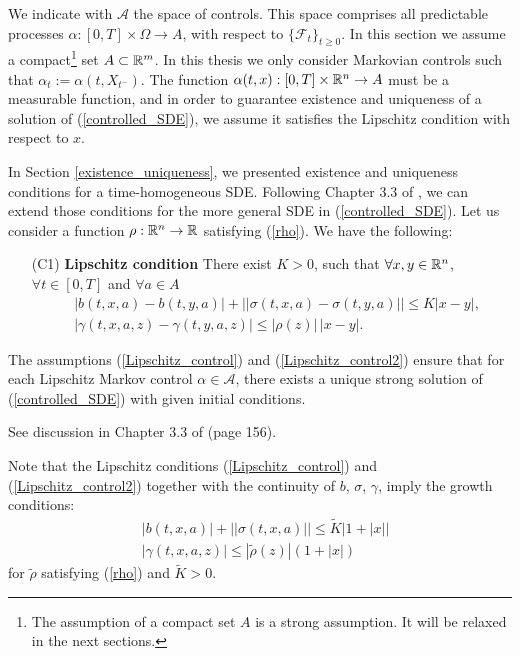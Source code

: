 We indicate with $\mathcal{A}$ the space of controls.
This space comprises all predictable processes $\alpha: [0,T]\times \Omega \to  A$, with respect to $\{\mathcal{F}_{t}\}_{t\geq 0}$.
In this section we assume a compact\footnote{The assumption of a compact set $A$ is a strong assumption. It will be relaxed in the next sections.} set $A \subset \mathbb{R}^m$.
In this thesis we only consider Markovian controls such that $\alpha_t := \alpha(t,X_{t^-}) $.
The function $\alpha(t,x) : [0,T] \times \mathbb{R}^n \to A$ must be a measurable function, and 
in order to guarantee existence and uniqueness of a solution of (\ref{controlled_SDE}), we assume it satisfies the Lipschitz condition with respect to $x$.

In Section \ref{existence_uniqueness}, we presented existence and uniqueness conditions for a time-homogeneous SDE. 
Following Chapter 3.3 of \cite{Skorohod}, we can extend 
those conditions for the more general SDE in (\ref{controlled_SDE}).
Let us consider a function $\rho : \mathbb{R}^n \to \mathbb{R} $ satisfying (\ref{rho}).
We have the following:
\begin{itemize}
 \item[(C1)] \textbf{Lipschitz condition} There exist $K >0$, such that $\forall x,y \in \mathbb{R}^n$, $\forall t \in [0,T]$ and $\forall a \in A$
 \begin{align}\label{Lipschitz_control}
  &|b(t,x,a) - b(t,y,a)| + || \sigma(t,x,a) - \sigma(t,y,a) || \leq K |x-y|,\\  
  & |\gamma(t,x,a,z) - \gamma(t,y,a,z)| \leq |\rho(z)|\,|x-y|. \label{Lipschitz_control2}
 \end{align}
\end{itemize}
\begin{Theorem}
 The assumptions (\ref{Lipschitz_control}) and (\ref{Lipschitz_control2}) 
 ensure that for each Lipschitz Markov control $\alpha \in \mathcal{A}$, there exists a unique strong solution of (\ref{controlled_SDE}) with given initial 
 conditions.
\end{Theorem}
See discussion in Chapter 3.3 of \cite{Skorohod} (page 156).

Note that the Lipschitz conditions (\ref{Lipschitz_control}) and (\ref{Lipschitz_control2}) together with the continuity of $b$, $\sigma$, $\gamma$, imply the growth conditions:
\begin{align}
 & |b(t,x,a)| + ||\sigma(t,x,a)||  \leq \tilde K |1+|x|| \\  
 & | \gamma(t,x,a,z) | \leq |\tilde \rho(z)| (1+|x|) \label{Growth_control2}
\end{align}
for $\tilde \rho$ satisfying (\ref{rho}) and $\tilde K > 0$.

